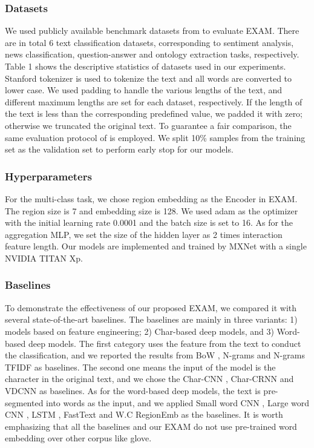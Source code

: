\documentclass[letterpaper]{article} \usepackage{aaai19}  \usepackage{times}  \usepackage{helvet}  \usepackage{courier}  \usepackage{url}  \usepackage{graphicx}
\begin{document}
\subsubsection{Datasets}
We used publicly available benchmark datasets from \cite{charcnn} to evaluate EXAM. There are in total 6 text classification datasets, corresponding to sentiment analysis, news classification, question-answer and ontology extraction tasks, respectively. Table 1 shows the descriptive statistics of datasets used in our experiments. Stanford tokenizer is used to tokenize the text and all words are converted to lower case. We used padding to handle the various lengths of the text, and different maximum lengths are set for each dataset, respectively. If the length of the text is less than the corresponding predefined value, we padded it with zero; otherwise we truncated the original text. To guarantee a fair comparison, the same evaluation protocol of \cite{charcnn} is employed. We split 10\% samples from the training set as the validation set to perform early stop for our models.

\subsubsection{Hyperparameters}
For the multi-class task, we chose region embedding as the Encoder in EXAM. The region size is 7 and embedding size is 128. We used adam \cite{adam} as the optimizer with the initial learning rate 0.0001 and the batch size is set to 16. As for the aggregation MLP, we set the size of the hidden layer as 2 times interaction feature length. Our models are implemented and trained by MXNet \cite{MXNet} with a single NVIDIA TITAN Xp.
\subsubsection{Baselines}
To demonstrate the effectiveness of our proposed EXAM, we compared it with several state-of-the-art baselines. The baselines are mainly in three variants: 1) models based on feature engineering; 2) Char-based deep models, and 3) Word-based deep models. The first category uses the feature from the text to conduct the classification, and we reported the results from BoW \cite{charcnn}, N-grams \cite{charcnn} and N-grams TFIDF \cite{charcnn} as baselines. The second one means the input of the model is the character in the original text, and we chose the Char-CNN \cite{charcnn}, Char-CRNN \cite{charcnn} and VDCNN \cite{vdcnn} as baselines. As for the word-based deep models, the text is pre-segmented into words as the input, and we applied Small word CNN \cite{charcnn}, Large word CNN \cite{charcnn}, LSTM \cite{charcnn}, FastText \cite{fasttext} and W.C RegionEmb \cite{regionemb} as the baselines.  It is worth emphasizing that all the baselines and our EXAM do not use pre-trained word embedding over other corpus like glove.
\end{document}
